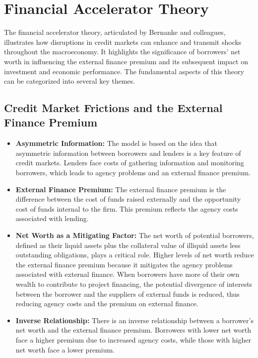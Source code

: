 \section{Financial Accelerator Theory}

The financial accelerator theory, articulated by Bernanke and colleagues, illustrates how disruptions in credit markets can enhance and transmit shocks throughout the macroeconomy. It highlights the significance of borrowers' net worth in influencing the external finance premium and its subsequent impact on investment and economic performance. The fundamental aspects of this theory can be categorized into several key themes.

\subsection{Credit Market Frictions and the External Finance Premium}
\begin{itemize}
    \item \textbf{Asymmetric Information:} The model is based on the idea that asymmetric information between borrowers and lenders is a key feature of credit markets. Lenders face costs of gathering information and monitoring borrowers, which leads to agency problems and an external finance premium.
    \item \textbf{External Finance Premium:} The external finance premium is the difference between the cost of funds raised externally and the opportunity cost of funds internal to the firm. This premium reflects the agency costs associated with lending.
    \item \textbf{Net Worth as a Mitigating Factor:} The net worth of potential borrowers, defined as their liquid assets plus the collateral value of illiquid assets less outstanding obligations, plays a critical role. Higher levels of net worth reduce the external finance premium because it mitigates the agency problems associated with external finance. When borrowers have more of their own wealth to contribute to project financing, the potential divergence of interests between the borrower and the suppliers of external funds is reduced, thus reducing agency costs and the premium on external finance.
    \item \textbf{Inverse Relationship:} There is an inverse relationship between a borrower's net worth and the external finance premium. Borrowers with lower net worth face a higher premium due to increased agency costs, while those with higher net worth face a lower premium.
\end{itemize}

